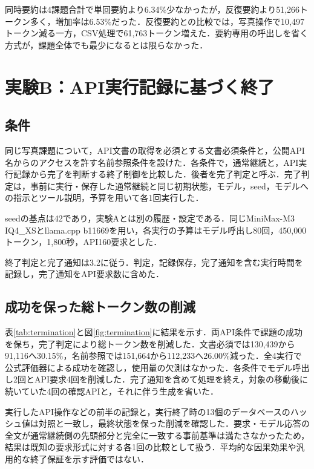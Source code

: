\documentclass[letter]{ieicej}
\begin{document}
同時要約は4課題合計で単回要約より6.34\%少なかったが，反復要約より51,266トークン多く，増加率は6.53\%だった．反復要約との比較では，写真操作で10,497トークン減る一方，CSV処理で61,763トークン増えた．要約専用の呼出しを省く方式が，課題全体でも最少になるとは限らなかった．

\section{実験B：API実行記録に基づく終了}

\subsection{条件}

同じ写真課題について，API文書の取得を必須とする文書必須条件と，公開API名からのアクセスを許す名前参照条件を設けた．各条件で，通常継続と，API実行記録から完了を判断する終了制御を比較した．後者を完了判定と呼ぶ．完了判定は，事前に実行・保存した通常継続と同じ初期状態，モデル，seed，モデルへの指示とツール説明，予算を用いて各1回実行した．

seedの基点は42であり，実験Aとは別の履歴・設定である．同じMiniMax-M3 IQ4\_XSとllama.cpp b11669を用い，各実行の予算はモデル呼出し80回，450,000トークン，1,800秒，API160要求とした．

終了判定と完了通知は3.2に従う．判定，記録保存，完了通知を含む実行時間を記録し，完了通知をAPI要求数に含めた．

\subsection{成功を保った総トークン数の削減}

表\ref{tab:termination}と図\ref{fig:termination}に結果を示す．両API条件で課題の成功を保ち，完了判定により総トークン数を削減した．文書必須では130,439から91,116へ30.15\%，名前参照では151,664から112,233へ26.00\%減った．全4実行で公式評価器による成功を確認し，使用量の欠測はなかった．各条件でモデル呼出し2回とAPI要求4回を削減した．完了通知を含めて処理を終え，対象の移動後に続いていた4回の確認APIと，それに伴う生成を省いた．

\TerminationResultsTable

実行したAPI操作などの前半の記録と，実行終了時の13個のデータベースのハッシュ値は対照と一致し，最終状態を保った削減を確認した．要求・モデル応答の全文が通常継続側の先頭部分と完全に一致する事前基準は満たさなかったため，結果は既知の要求形式に対する各1回の比較として扱う．平均的な因果効果や汎用的な終了保証を示す評価ではない．
\end{document}
